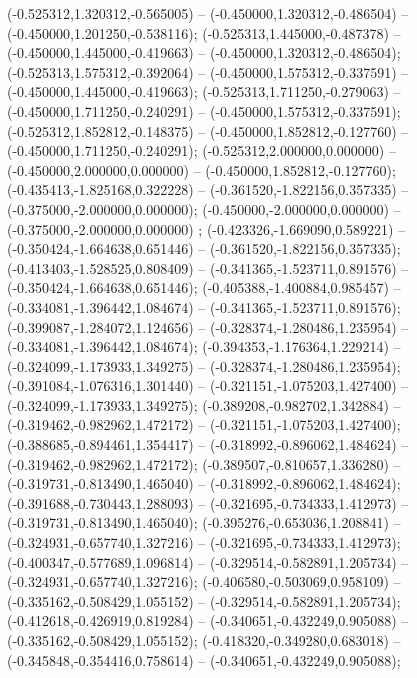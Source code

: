  (-0.525312,1.320312,-0.565005) -- (-0.450000,1.320312,-0.486504) -- (-0.450000,1.201250,-0.538116);
 (-0.525313,1.445000,-0.487378) -- (-0.450000,1.445000,-0.419663) -- (-0.450000,1.320312,-0.486504);
 (-0.525313,1.575312,-0.392064) -- (-0.450000,1.575312,-0.337591) -- (-0.450000,1.445000,-0.419663);
 (-0.525313,1.711250,-0.279063) -- (-0.450000,1.711250,-0.240291) -- (-0.450000,1.575312,-0.337591);
 (-0.525312,1.852812,-0.148375) -- (-0.450000,1.852812,-0.127760) -- (-0.450000,1.711250,-0.240291);
 (-0.525312,2.000000,0.000000) -- (-0.450000,2.000000,0.000000) -- (-0.450000,1.852812,-0.127760);
 (-0.435413,-1.825168,0.322228) -- (-0.361520,-1.822156,0.357335) -- (-0.375000,-2.000000,0.000000);
 (-0.450000,-2.000000,0.000000) -- (-0.375000,-2.000000,0.000000) ;
 (-0.423326,-1.669090,0.589221) -- (-0.350424,-1.664638,0.651446) -- (-0.361520,-1.822156,0.357335);
 (-0.413403,-1.528525,0.808409) -- (-0.341365,-1.523711,0.891576) -- (-0.350424,-1.664638,0.651446);
 (-0.405388,-1.400884,0.985457) -- (-0.334081,-1.396442,1.084674) -- (-0.341365,-1.523711,0.891576);
 (-0.399087,-1.284072,1.124656) -- (-0.328374,-1.280486,1.235954) -- (-0.334081,-1.396442,1.084674);
 (-0.394353,-1.176364,1.229214) -- (-0.324099,-1.173933,1.349275) -- (-0.328374,-1.280486,1.235954);
 (-0.391084,-1.076316,1.301440) -- (-0.321151,-1.075203,1.427400) -- (-0.324099,-1.173933,1.349275);
 (-0.389208,-0.982702,1.342884) -- (-0.319462,-0.982962,1.472172) -- (-0.321151,-1.075203,1.427400);
 (-0.388685,-0.894461,1.354417) -- (-0.318992,-0.896062,1.484624) -- (-0.319462,-0.982962,1.472172);
 (-0.389507,-0.810657,1.336280) -- (-0.319731,-0.813490,1.465040) -- (-0.318992,-0.896062,1.484624);
 (-0.391688,-0.730443,1.288093) -- (-0.321695,-0.734333,1.412973) -- (-0.319731,-0.813490,1.465040);
 (-0.395276,-0.653036,1.208841) -- (-0.324931,-0.657740,1.327216) -- (-0.321695,-0.734333,1.412973);
 (-0.400347,-0.577689,1.096814) -- (-0.329514,-0.582891,1.205734) -- (-0.324931,-0.657740,1.327216);
 (-0.406580,-0.503069,0.958109) -- (-0.335162,-0.508429,1.055152) -- (-0.329514,-0.582891,1.205734);
 (-0.412618,-0.426919,0.819284) -- (-0.340651,-0.432249,0.905088) -- (-0.335162,-0.508429,1.055152);
 (-0.418320,-0.349280,0.683018) -- (-0.345848,-0.354416,0.758614) -- (-0.340651,-0.432249,0.905088);
